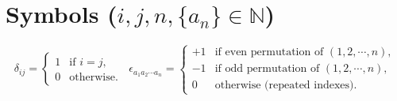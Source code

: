 \section*{Symbols \normalfont\scriptsize{($i,j,n,\{a_n\}\in\mathbb{N}$)}}
\[
\delta_{ij}\!=\!\begin{cases}1&\!\!\!\text{if }i\!=\!j,\\0&\!\!\!\text{otherwise.}\end{cases}
\;\;
\epsilon_{a_1 a_2\cdots a_n}\!=\!\begin{cases}
+1&\!\!\!\text{if even permutation of }(1,2,\cdots, n),\\
-1&\!\!\!\text{if odd \ permutation of }(1,2, \cdots,n),\\
0&\!\!\!\text{otherwise (repeated indexes).}
\end{cases}
\]